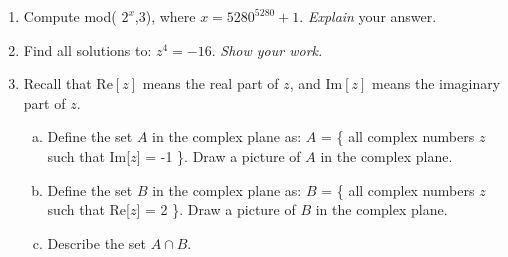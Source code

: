 
\begin{enumerate}[(1)]


\item
Compute mod( $2^{x}$,3), where $x = 5280^{5280}+1$. \emph{Explain} your answer. 

\item
Find all solutions to: $z^4 = -16$.  \emph{Show your work.}


\item
Recall that $\textrm{Re}[z]$ means the real part of $z$, and  $\textrm{Im}[z]$ means the imaginary part of $z$.
\begin{enumerate}[(a)]
\item
Define the set $A$ in the complex plane as:    $A$ = \{ all complex numbers  $z$ such that Im[$z$]  = -1 \}.  Draw a picture of $A$ in the complex plane.
\item
Define the set $B$ in the complex plane as:    $B$ = \{ all complex numbers  $z$ such that Re[$z$]  = 2 \}.  Draw a picture of $B$ in the complex plane.
\item Describe the set $A \cap B$.
\end{enumerate}






\end{enumerate}

